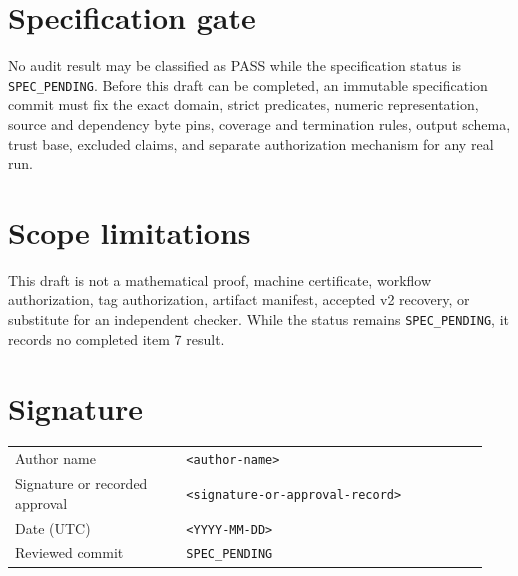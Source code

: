\documentclass[11pt]{article}
\newcommand{\specpending}{\texttt{SPEC\_PENDING}}
\newcommand{\placeholder}[1]{\texttt{<#1>}}
\begin{document}
\section*{Specification gate}

No audit result may be classified as PASS while the specification status is
\specpending. Before this draft can be completed, an immutable specification
commit must fix the exact domain, strict predicates, numeric representation,
source and dependency byte pins, coverage and termination rules, output
schema, trust base, excluded claims, and separate authorization mechanism for
any real run.

\section*{Scope limitations}

This draft is not a mathematical proof, machine certificate, workflow
authorization, tag authorization, artifact manifest, accepted v2 recovery, or
substitute for an independent checker. While the status remains
\specpending, it records no completed item 7 result.

\section*{Signature}

\begin{tabular}{>{\raggedright\arraybackslash}p{0.34\linewidth}p{0.60\linewidth}}
Author name & \placeholder{author-name} \\
Signature or recorded approval & \placeholder{signature-or-approval-record} \\
Date (UTC) & \placeholder{YYYY-MM-DD} \\
Reviewed commit & \specpending \\
\end{tabular}
\end{document}
